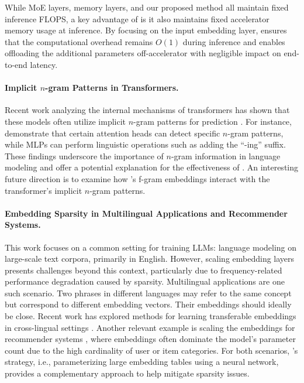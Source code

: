While MoE layers, memory layers, and our proposed method \SCONE all maintain fixed inference FLOPS, a key advantage of \SCONE is it also maintains fixed accelerator memory usage at inference. By focusing on the input embedding layer, \SCONE ensures that the computational overhead remains $O(1)$ during inference and enables offloading the additional parameters off-accelerator with negligible impact on end-to-end latency.



\paragraph{Implicit $n$-gram Patterns in Transformers.} Recent work analyzing the internal mechanisms of transformers has shown that these models often utilize implicit $n$-gram patterns for prediction \citep{geva2020transformer,geva2022transformer,voita2023neurons}. For instance, \citet{chen2024jet} demonstrate that certain attention heads can detect specific $n$-gram patterns, while MLPs can perform linguistic operations such as adding the “-ing” suffix. These findings underscore the importance of $n$-gram information in language modeling and offer a potential explanation for the effectiveness of \SCONE. An interesting future direction is to examine how \SCONE's f-gram embeddings interact with the transformer’s implicit $n$-gram patterns.

\paragraph{Embedding Sparsity in Multilingual Applications and Recommender Systems.} This work focuses on a common setting for training LLMs: language modeling on large-scale text corpora, primarily in English. However, scaling embedding layers presents challenges beyond this context, particularly due to frequency-related performance degradation caused by sparsity. Multilingual applications are one such scenario. Two phrases in different languages may refer to the same concept but correspond to different embedding vectors. Their embeddings should ideally be close. Recent work has explored methods for learning transferable embeddings in cross-lingual settings \citep{artetxe2019cross, chen2023improving}. Another relevant example is scaling the embeddings for recommender systems \citep{chen2019lambdaopt, liu2021learnable}, where embeddings often dominate the model's parameter count due to the high cardinality of user or item categories. For both scenarios, \SCONE’s strategy, i.e., parameterizing large embedding tables using a neural network, provides a complementary approach to help mitigate sparsity issues.
